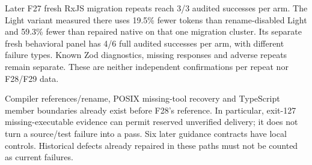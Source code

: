 \documentclass[11pt,a4paper]{article}
\begin{document}
Later F27 fresh RxJS migration repeats reach 3/3 audited successes per arm.
The Light variant measured there uses 19.5\% fewer tokens than rename-disabled Light and 59.3\%
fewer than repaired native on that one migration cluster. Its separate fresh
behavioral panel has 4/6 full audited successes per arm, with different failure
types. Known Zod diagnostics, missing responses and adverse repeats remain
separate. These are neither independent confirmations per repeat nor F28/F29 data.

Compiler references/rename, POSIX missing-tool recovery and TypeScript member
boundaries already exist before F28's reference. In particular, exit-127
missing-executable evidence can permit reserved unverified delivery; it does not
turn a source/test failure into a pass. Six later guidance contracts have local
controls. Historical defects already repaired in these paths must not be counted
as current failures.
\end{document}
